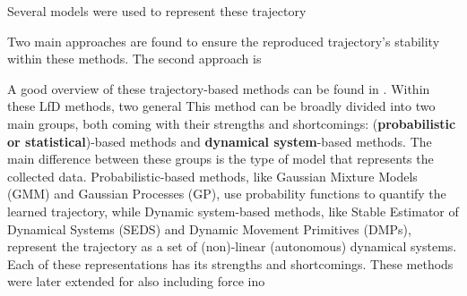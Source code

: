 Several models were used to represent these trajectory

Two main approaches are found to ensure the reproduced trajectory's stability within these methods.
The second approach is

A good overview of these trajectory-based methods can be found in \cite{siReviewManipulationSkill2021}. Within these LfD methods, two general
This method can be broadly divided into two main groups, both coming with their strengths and shortcomings: (\textbf{probabilistic or statistical})-based methods and \textbf{dynamical system}-based methods. The main difference between these groups is the type of model that represents the collected data. Probabilistic-based methods, like Gaussian Mixture Models (GMM) and Gaussian Processes (GP),
use probability functions to quantify the learned trajectory, while Dynamic system-based methods, like Stable Estimator of Dynamical Systems (SEDS) and Dynamic Movement Primitives (DMPs), represent the trajectory as a set of (non)-linear (autonomous) dynamical systems. Each of these representations has its strengths and shortcomings.
These methods were later extended for also including force ino
